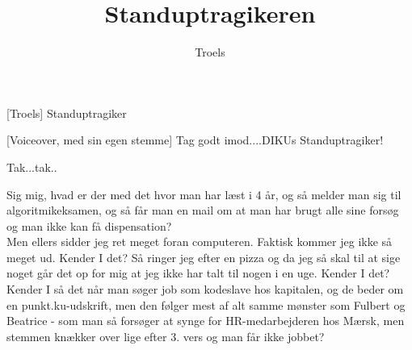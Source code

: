 \documentclass[a4paper,11pt]{article}
\title{Standuptragikeren}
\author{Troels}
\begin{document}
\maketitle

\begin{roles}
[Troels] Standuptragiker
\end{roles}

  
\begin{sketch}

[Voiceover, med sin egen stemme] Tag godt imod....DIKUs Standuptragiker!


 Tak...tak..

Sig mig, hvad er der med det hvor man har læst i 4 år, og så melder man sig til algoritmikeksamen, og så får man en mail om at man har brugt alle sine forsøg og man ikke kan få dispensation?\\

Men ellers sidder jeg ret meget foran computeren. Faktisk kommer jeg ikke så meget ud. Kender I det? Så ringer jeg efter en pizza og da jeg så skal til at sige noget går det op for mig at jeg ikke har talt til nogen i en uge. Kender I det?\\

Kender I så det når man søger job som kodeslave hos kapitalen, og de beder om en punkt.ku-udskrift, men den følger mest af alt samme mønster som Fulbert og Beatrice - som man så forsøger at synge for HR-medarbejderen hos Mærsk, men stemmen knækker over lige efter 3. vers og man får ikke jobbet? 


\end{sketch}
\end{document}
